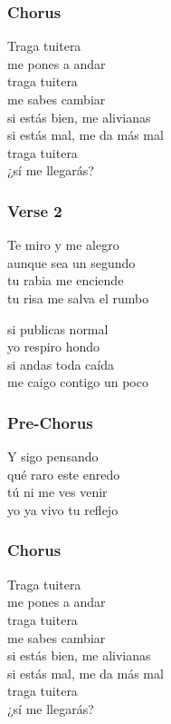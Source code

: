 \subsubsection{Chorus}\label{chorus-29}

Traga tuitera\\
me pones a andar\\
traga tuitera\\
me sabes cambiar\\
si estás bien, me alivianas\\
si estás mal, me da más mal\\
traga tuitera\\
¿sí me llegarás?

\subsubsection{Verse 2}\label{verse-2-12}

Te miro y me alegro\\
aunque sea un segundo\\
tu rabia me enciende\\
tu risa me salva el rumbo

si publicas normal\\
yo respiro hondo\\
si andas toda caída\\
me caigo contigo un poco

\subsubsection{Pre-Chorus}\label{pre-chorus-15}

Y sigo pensando\\
qué raro este enredo\\
tú ni me ves venir\\
yo ya vivo tu reflejo

\subsubsection{Chorus}\label{chorus-30}

Traga tuitera\\
me pones a andar\\
traga tuitera\\
me sabes cambiar\\
si estás bien, me alivianas\\
si estás mal, me da más mal\\
traga tuitera\\
¿sí me llegarás?

